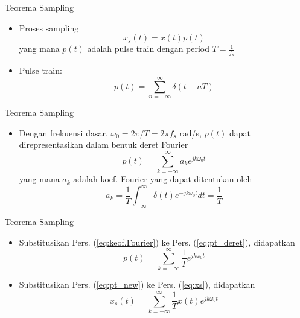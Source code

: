 \documentclass[pdflatex,compress,mathserif]{beamer}
\begin{document}
\begin{frame}{Teorema Sampling}
    \begin{itemize}
        \item Proses sampling
        \begin{equation}
            x_s(t) = x(t) p(t)
            \label{eq:xs}
        \end{equation}
        yang mana $p(t)$ adalah pulse train dengan period $T = \frac{1}{f_s}$
        \item Pulse train:
        \begin{equation}
            p(t) = \sum_{n = - \infty}^\infty \delta(t - nT)
        \end{equation}
    \end{itemize}
\end{frame}

\begin{frame}{Teorema Sampling}
    \begin{itemize}
        \item Dengan frekuensi dasar, $\omega_0 = 2\pi/T = 2\pi f_s$ rad/s, $p(t)$ dapat direpresentasikan dalam bentuk deret Fourier
        \begin{equation}
            p(t) = \sum_{k = - \infty}^\infty a_k e^{jk\omega_0t}
            \label{eq:pt_deret}
        \end{equation}
        yang mana $a_k$ adalah koef. Fourier yang dapat ditentukan oleh
        \begin{equation}
            a_k = \frac{1}{T} \int_{-\infty}^{\infty} \delta(t)e^{-jk\omega_0t}dt = \frac{1}{T}
            \label{eq:keof.Fourier}
        \end{equation}
    \end{itemize}
\end{frame}

\begin{frame}{Teorema Sampling}
    \begin{itemize}
        \item Substitusikan Pers. (\ref{eq:keof.Fourier}) ke Pers. (\ref{eq:pt_deret}), didapatkan
        \begin{equation}
            p(t) = \sum_{k = -\infty}^{\infty} \frac{1}{T} e^{jk\omega_0t}
            \label{eq:pt_new}
        \end{equation}
        \item Substitusikan Pers. (\ref{eq:pt_new}) ke Pers. (\ref{eq:xs}), didapatkan
        \begin{equation}
            x_s(t) = \sum_{k = -\infty}^{\infty} \frac{1}{T} x(t) e^{jk\omega_0t}
            \label{eq:xs_new}
        \end{equation}
    \end{itemize}
\end{frame}
\end{document}
